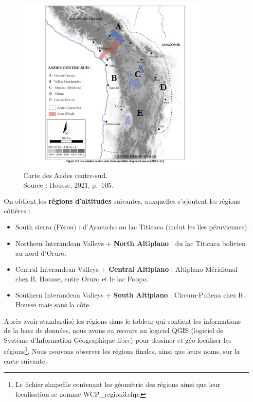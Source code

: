   \begin{figure}[!h]
	\begin{center}
		\includegraphics[width=10cm]{../images/mapHOUSSE_2021_p105.png}
           	 \caption{Carte des Andes centre-sud. \\ Source : Housse, 2021, p.~105.}
           	 \label{fig:carteHousse}
	 \end{center}
  \end{figure}

\noindent On obtient les \textbf{régions d'altitudes} suivantes, auxquelles s'ajoutent les régions côtières : 
\begin{itemize}
	\item South sierra (Pérou) : d'Ayacucho au lac Titicaca (inclut les îles péruviennes).
	\item Northern Interandean Valleys + \textbf{North Altiplano} : du lac Titicaca bolivien au nord d'Oruro.
	\item Central Interandean Valleys + \textbf{Central Altiplano} : Altiplano Méridional chez R. Housse, entre Oruro et le lac Poopo.
	\item Southern Interandean Valleys + \textbf{South Altiplano} : Circum-Puñena chez R. Housse mais sans la côte.
\end{itemize}

Après avoir standardisé les régions dans le tableur qui contient les informations de la base de données, nous avons eu recours au logiciel QGIS (logiciel de Système d'Information Géographique libre) pour dessiner et géo-localiser les régions\footnote{Le fichier shapefile contenant les géométrie des régions ainsi que leur localisation se nomme WCP\_region3.shp.}. Nous pouvons observer les régions finales, ainsi que leurs noms, sur la carte suivante.

